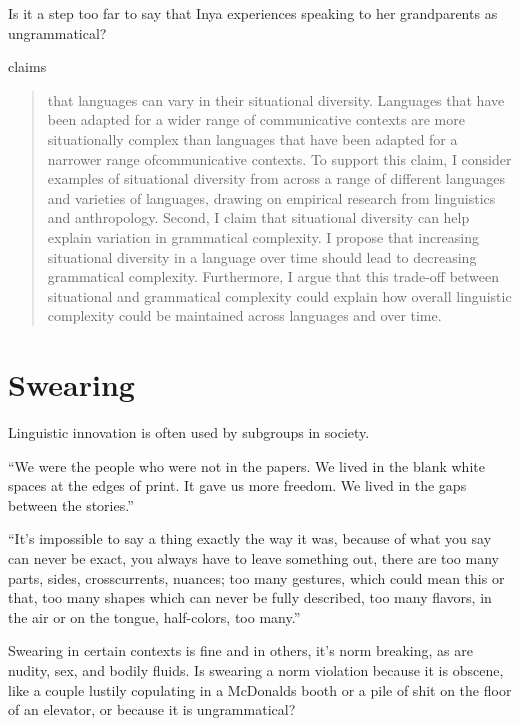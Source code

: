 Is it a step too far to say that Inya experiences speaking to her grandparents as ungrammatical? 

\citet{Grieve2023} claims

\begin{quote}
    that languages can vary in their situational diversity. Languages that have been adapted for a wider range of communicative contexts are more situationally complex than languages that have been adapted for a narrower range ofcommunicative contexts. To support this claim, I consider examples of situational diversity from across a range of different languages and varieties of languages, drawing on empirical research from linguistics and anthropology. Second, I claim that situational diversity can help explain variation in grammatical complexity. I propose that increasing situational diversity in a language over time should lead to decreasing grammatical complexity. Furthermore, I argue that this trade-off between situational and grammatical complexity could explain how overall linguistic complexity could be maintained across languages and over time.
\end{quote}

\section{Swearing}



Linguistic innovation is often used by subgroups in society. 

“We were the people who were not in the papers. We lived in the blank white spaces at the edges of print. It gave us more freedom.
We lived in the gaps between the stories.”

“It's impossible to say a thing exactly the way it was, because of what you say can never be exact, you always have to leave something out, there are too many parts, sides, crosscurrents, nuances; too many gestures, which could mean this or that, too many shapes which can never be fully described, too many flavors, in the air or on the tongue, half-colors, too many.”

Swearing in certain contexts is fine and in others, it's norm breaking, as are nudity, sex, and bodily fluids. Is swearing a norm violation because it is obscene, like a couple lustily copulating in a McDonalds booth or a pile of shit on the floor of an elevator, or because it is ungrammatical?

